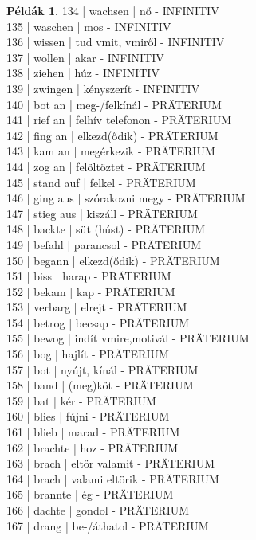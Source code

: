 \documentclass{article}
\theoremstyle{definition}
\newtheorem*{exmp}{Példák}
\begin{document}
\begin{exmp}
134 | wachsen | nő - INFINITIV\\
135 | waschen | mos - INFINITIV\\
136 | wissen | tud vmit, vmiről - INFINITIV\\
137 | wollen | akar - INFINITIV\\
138 | ziehen | húz - INFINITIV\\
139 | zwingen | kényszerít - INFINITIV\\
140 | bot an | meg-/felkínál - PRÄTERIUM\\
141 | rief an | felhív telefonon - PRÄTERIUM\\
142 | fing an | elkezd(ődik) - PRÄTERIUM\\
143 | kam an  | megérkezik - PRÄTERIUM\\
144 | zog an | felöltöztet - PRÄTERIUM\\
145 | stand auf | felkel - PRÄTERIUM\\
146 | ging aus | szórakozni megy - PRÄTERIUM\\
147 | stieg aus | kiszáll - PRÄTERIUM\\
148 | backte | süt (húst) - PRÄTERIUM\\
149 | befahl | parancsol - PRÄTERIUM\\
150 | begann | elkezd(ődik) - PRÄTERIUM\\
151 | biss | harap - PRÄTERIUM\\
152 | bekam | kap - PRÄTERIUM\\
153 | verbarg | elrejt - PRÄTERIUM\\
154 | betrog | becsap - PRÄTERIUM\\
155 | bewog | indít vmire,motivál - PRÄTERIUM\\
156 | bog | hajlít - PRÄTERIUM\\
157 | bot | nyújt, kínál - PRÄTERIUM\\
158 | band | (meg)köt - PRÄTERIUM\\
159 | bat | kér - PRÄTERIUM\\
160 | blies | fújni - PRÄTERIUM\\
161 | blieb | marad - PRÄTERIUM\\
162 | brachte | hoz - PRÄTERIUM\\
163 | brach | eltör valamit - PRÄTERIUM\\
164 | brach | valami eltörik - PRÄTERIUM\\
165 | brannte | ég - PRÄTERIUM\\
166 | dachte | gondol - PRÄTERIUM\\
167 | drang | be-/áthatol - PRÄTERIUM\\

\end{exmp}
\end{document}
